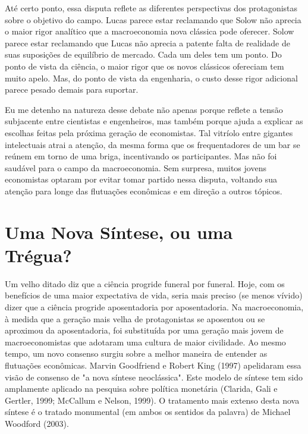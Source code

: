 \documentclass[12pt]{article}
\begin{document}
Até certo ponto, essa disputa reflete as diferentes perspectivas dos protagonistas sobre o objetivo do campo. Lucas parece estar reclamando que Solow não aprecia o maior rigor analítico que a macroeconomia nova clássica pode oferecer. Solow parece estar reclamando que Lucas não aprecia a patente falta de realidade de suas suposições de equilíbrio de mercado. Cada um deles tem um ponto. Do ponto de vista da ciência, o maior rigor que os novos clássicos ofereciam tem muito apelo. Mas, do ponto de vista da engenharia, o custo desse rigor adicional parece pesado demais para suportar.

Eu me detenho na natureza desse debate não apenas porque reflete a tensão subjacente entre cientistas e engenheiros, mas também porque ajuda a explicar as escolhas feitas pela próxima geração de economistas. Tal vitríolo entre gigantes intelectuais atrai a atenção, da mesma forma que os frequentadores de um bar se reúnem em torno de uma briga, incentivando os participantes. Mas não foi saudável para o campo da macroeconomia. Sem surpresa, muitos jovens economistas optaram por evitar tomar partido nessa disputa, voltando sua atenção para longe das flutuações econômicas e em direção a outros tópicos.

\section{Uma Nova Síntese, ou uma Trégua?}

Um velho ditado diz que a ciência progride funeral por funeral. Hoje, com os benefícios de uma maior expectativa de vida, seria mais preciso (se menos vívido) dizer que a ciência progride aposentadoria por aposentadoria. Na macroeconomia, à medida que a geração mais velha de protagonistas se aposentou ou se aproximou da aposentadoria, foi substituída por uma geração mais jovem de macroeconomistas que adotaram uma cultura de maior civilidade. Ao mesmo tempo, um novo consenso surgiu sobre a melhor maneira de entender as flutuações econômicas. Marvin Goodfriend e Robert King (1997) apelidaram essa visão de consenso de "a nova síntese neoclássica". Este modelo de síntese tem sido amplamente aplicado na pesquisa sobre política monetária (Clarida, Gali e Gertler, 1999; McCallum e Nelson, 1999). O tratamento mais extenso desta nova síntese é o tratado monumental (em ambos os sentidos da palavra) de Michael Woodford (2003).
\end{document}
